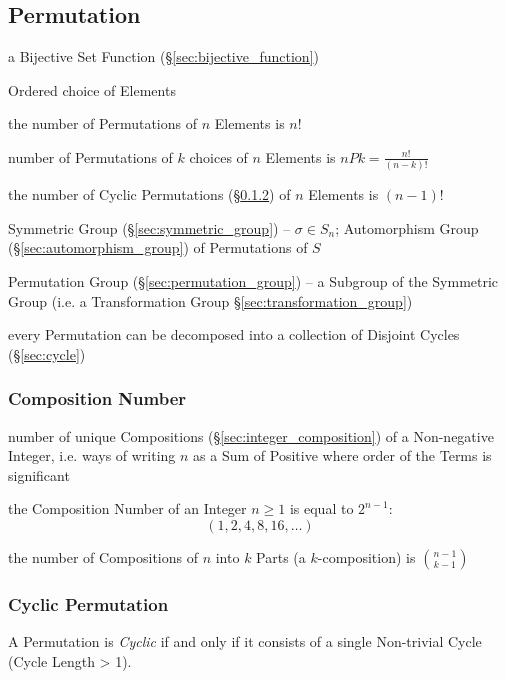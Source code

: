 \subsection{Permutation}\label{sec:permutation}

a Bijective Set Function (\S\ref{sec:bijective_function})

Ordered choice of Elements

the number of Permutations of $n$ Elements is $n!$

number of Permutations of $k$ choices of $n$ Elements is
$nPk = \frac{n!}{(n-k)!}$

the number of Cyclic Permutations (\S\ref{sec:cyclic_permutation}) of $n$
Elements is $(n-1)!$

Symmetric Group (\S\ref{sec:symmetric_group}) -- $\sigma \in S_n$; Automorphism
Group (\S\ref{sec:automorphism_group}) of Permutations of $S$

Permutation Group (\S\ref{sec:permutation_group}) -- a Subgroup of the Symmetric
Group (i.e. a Transformation Group \S\ref{sec:transformation_group})

every Permutation can be decomposed into a collection of Disjoint Cycles
(\S\ref{sec:cycle})



\subsubsection{Composition Number}\label{sec:composition_number}

number of unique Compositions (\S\ref{sec:integer_composition}) of a
Non-negative Integer, i.e. ways of writing $n$ as a Sum of Positive where order
of the Terms is significant

the Composition Number of an Integer $n \geq 1$ is equal to $2^{n-1}$:
\[
  (1, 2, 4, 8, 16, \ldots)
\]

the number of Compositions of $n$ into $k$ Parts (a $k$-composition) is
$\binom{n-1}{k-1}$



\subsubsection{Cyclic Permutation}\label{sec:cyclic_permutation}

A Permutation is \emph{Cyclic} if and only if it consists of a single
Non-trivial Cycle (Cycle Length > 1).



